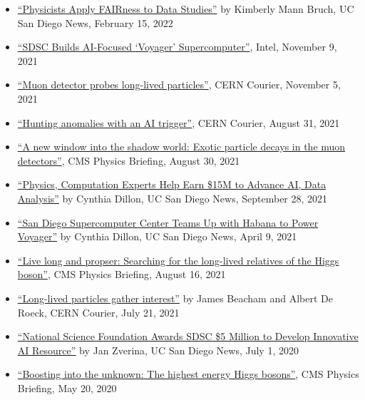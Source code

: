 \documentclass[11pt]{res}
\begin{document}
\begin{resume}
\begin{itemize}
    \item \href{https://ucsdnews.ucsd.edu/pressrelease/physicists-apply-fairness-to-data-studies}{``Physicists Apply FAIRness to Data Studies''} by Kimberly Mann Bruch, UC San Diego News, February 15, 2022
    \item \href{https://www.intel.com/content/www/us/en/customer-spotlight/stories/san-diego-supercomputer-customer-story.html}{``SDSC Builds AI-Focused `Voyager' Supercomputer''}, Intel, November 9, 2021
    \item \href{https://cerncourier.com/a/muon-detector-probes-long-lived-particles/}{``Muon detector probes long-lived particles''}, CERN Courier, November 5, 2021
    \item \href{https://cerncourier.com/a/hunting-anomalies-with-an-ai-trigger/}{``Hunting anomalies with an AI trigger''}, CERN Courier, August 31, 2021
    \item \href{https://cms.cern/news/new-window-shadow-world-exotic-particle-decays-muon-detectors}{``A new window into the shadow world: Exotic particle decays in the muon detectors''}, CMS Physics Briefing, August 30, 2021
    \item \href{https://ucsdnews.ucsd.edu/pressrelease/physics-computation-experts-help-earn-15m-to-advance-ai-data-analysis}{``Physics, Computation Experts Help Earn \$15M to Advance AI, Data Analysis''} by Cynthia Dillon, UC San Diego News, September 28, 2021
    \item \href{https://ucsdnews.ucsd.edu/pressrelease/san-diego-supercomputer-center-teams-up-with-habana-to-power-voyager}{``San Diego Supercomputer Center Teams Up with Habana to Power Voyager''} by Cynthia Dillon, UC San Diego News, April 9, 2021
    \item \href{https://cms.cern/news/live-long-and-prosper-searching-long-lived-relatives-higgs-boson}{``Live long and propser: Searching for the long-lived relatives of the Higgs boson''}, CMS Physics Briefing, August 16, 2021
    \item \href{https://cerncourier.com/a/long-lived-particles-gather-interest/}{``Long-lived particles gather interest''} by James Beacham and Albert De Roeck, CERN Courier, July 21, 2021
    \item \href{https://ucsdnews.ucsd.edu/pressrelease/national-science-foundation-awards-sdsc-5-million-to-develop-innovative-ai-resource}{``National Science Foundation Awards SDSC \$5 Million to Develop Innovative AI Resource''} by Jan Zverina, UC San Diego News, July 1, 2020
    \item \href{https://cms.cern/news/boosting-unknown-highest-energy-higgs-bosons}{``Boosting into the unknown: The highest energy Higgs bosons''}, CMS Physics Briefing, May 20, 2020

\end{itemize}
\end{resume}
\end{document}
